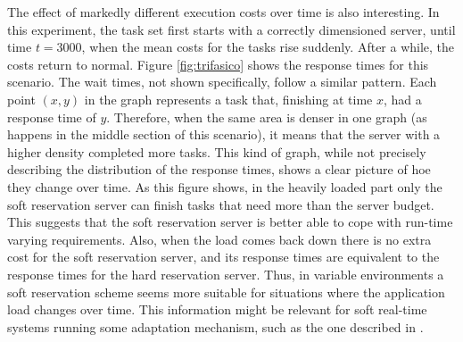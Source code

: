 \documentclass[times, 10pt,twocolumn]{article}
\begin{document}
The effect of markedly different execution costs over time is also
interesting. In this experiment, the task set first starts with a
correctly dimensioned server, until time $t=3000$, when the mean costs
for the tasks rise suddenly. After a while, the costs return to
normal. Figure \ref{fig:trifasico} shows the response times for this
scenario. The wait times, not shown specifically, follow a similar
pattern. Each point $(x,y)$ in the graph represents a task that,
finishing at time $x$, had a response time of $y$. Therefore, when the
same area is denser in one graph (as happens in the middle section of
this scenario), it means that the server with a higher density
completed more tasks. This kind of graph, while not precisely
describing the distribution of the response times, shows a clear
picture of hoe they change over time. As this figure shows, in the
heavily loaded part only the soft reservation server can finish tasks
that need more than the server budget. This suggests that the soft
reservation server is better able to cope with run-time varying
requirements. Also, when the load comes back down there is no extra
cost for the soft reservation server, and its response times are
equivalent to the response times for the hard reservation
server. Thus, in variable environments a soft reservation scheme seems
more suitable for situations where the application load changes over
time. This information might be relevant for soft real-time systems
running some adaptation mechanism, such as the one described in
\cite{abeni.ea05:qos}.
\end{document}
